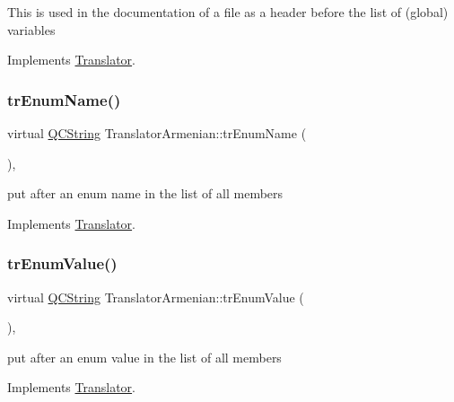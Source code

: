 This is used in the documentation of a file as a header before the list of (global) variables 

Implements \mbox{\hyperlink{class_translator}{Translator}}.

\mbox{\label{class_translator_armenian_afe693b07a06164151798e489e3063bc2}} 
\subsubsection{\texorpdfstring{trEnumName()}{trEnumName()}}
{\footnotesize\ttfamily virtual \mbox{\hyperlink{class_q_c_string}{Q\+C\+String}} Translator\+Armenian\+::tr\+Enum\+Name (\begin{DoxyParamCaption}{ }\end{DoxyParamCaption})\hspace{0.3cm}{\ttfamily [inline]}, {\ttfamily [virtual]}}

put after an enum name in the list of all members 

Implements \mbox{\hyperlink{class_translator}{Translator}}.

\mbox{\label{class_translator_armenian_a93fc9e1199055fd79ef12a97376c0121}} 
\subsubsection{\texorpdfstring{trEnumValue()}{trEnumValue()}}
{\footnotesize\ttfamily virtual \mbox{\hyperlink{class_q_c_string}{Q\+C\+String}} Translator\+Armenian\+::tr\+Enum\+Value (\begin{DoxyParamCaption}{ }\end{DoxyParamCaption})\hspace{0.3cm}{\ttfamily [inline]}, {\ttfamily [virtual]}}

put after an enum value in the list of all members 

Implements \mbox{\hyperlink{class_translator}{Translator}}.

\mbox{\label{class_translator_armenian_a6303975646065cd8f50ab63a69982de6}} 

